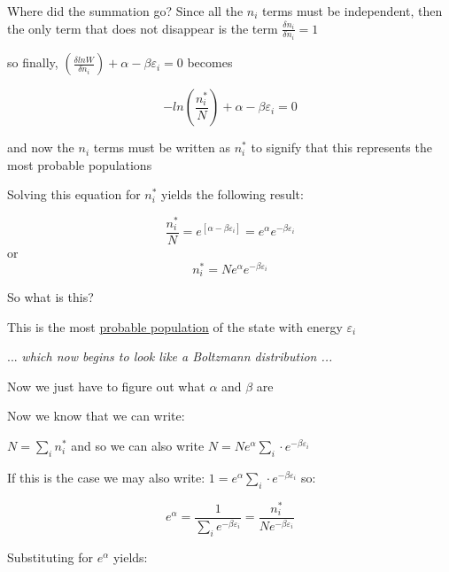 \documentclass[ignorenonframetext]{beamer}
\begin{document}
\begin{frame}[allowframebreaks]
Where did the summation go?  Since all the \(n_i\) terms must be independent, then the only term that does not disappear is the term \(\frac{\delta n_i}{\delta n_i}  = 1\)\par\medskip

so finally, \(\left(\frac{\delta lnW}{\delta n_i}\right) + \alpha - \beta \varepsilon_i = 0\) becomes\par
\[-ln\left(\frac{n_i^*}{N}\right) + \alpha - \beta \varepsilon_i = 0\]

and now the \(n_i\) terms must be written as \(n_i^*\) to signify that this represents the most probable populations\par\medskip

Solving this equation for \(n_i^*\) yields the following result:\par\medskip
\[\frac{n_i^*}{N} = e^{[\alpha - \beta \varepsilon_i]} = e^\alpha e^{-\beta\varepsilon_i}\]
or
\[n^*_i = N e^\alpha e^{-\beta\varepsilon_i}\]

So what is this?\par
This is the most \underline{probable population} of the state with energy \(\varepsilon_i\)\par
... \textit{which now begins to look like a Boltzmann distribution ...}\par\medskip
Now we just have to figure out what \(\alpha\) and \(\beta\) are\par\medskip

Now we know that we can write:\par\medskip

\(N=\sum_i n_i^*\) and so we can also write \(N=Ne^{\alpha}\sum_i \cdot e^{-\beta \varepsilon_i}\)\par\medskip

If this is the case we may also write: \(1 = e^{\alpha}\sum_i \cdot e^{-\beta \varepsilon_i}\) so:\par\medskip

\[e^\alpha = \frac{1}{\sum_i e^{-\beta \varepsilon_i}} = \frac{n_i^*}{Ne^{-\beta\varepsilon_i}}\]\par\medskip

Substituting for \(e^\alpha\) yields:\par
\begin{center}
\setlength{\fboxrule}{5pt}
\end{center}
\end{frame}
\end{document}
